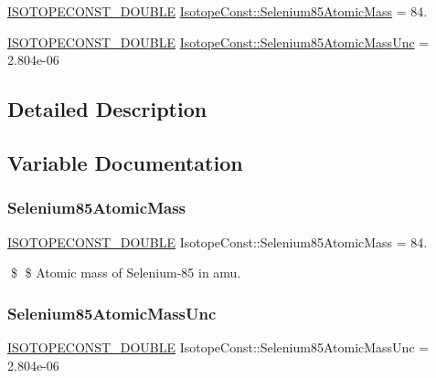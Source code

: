 \begin{DoxyCompactItemize}
\item 
\mbox{\hyperlink{group___isotope_const-_macros_ga8f45a7272ce02c0b4c65c44636ed719a}{I\+S\+O\+T\+O\+P\+E\+C\+O\+N\+S\+T\+\_\+\+D\+O\+U\+B\+LE}} \mbox{\hyperlink{group___isotope_const-_selenium-_se85_ga72aab77df93bbc245f383f331e1ce17c}{Isotope\+Const\+::\+Selenium85\+Atomic\+Mass}} = 84.
\item 
\mbox{\hyperlink{group___isotope_const-_macros_ga8f45a7272ce02c0b4c65c44636ed719a}{I\+S\+O\+T\+O\+P\+E\+C\+O\+N\+S\+T\+\_\+\+D\+O\+U\+B\+LE}} \mbox{\hyperlink{group___isotope_const-_selenium-_se85_ga444be9888ea6e24f270e89724ccba2f8}{Isotope\+Const\+::\+Selenium85\+Atomic\+Mass\+Unc}} = 2.\+804e-\/06
\end{DoxyCompactItemize}


\subsection{Detailed Description}


\subsection{Variable Documentation}
\mbox{\label{group___isotope_const-_selenium-_se85_ga72aab77df93bbc245f383f331e1ce17c}} 
\subsubsection{\texorpdfstring{Selenium85\+Atomic\+Mass}{Selenium85AtomicMass}}
{\footnotesize\ttfamily \mbox{\hyperlink{group___isotope_const-_macros_ga8f45a7272ce02c0b4c65c44636ed719a}{I\+S\+O\+T\+O\+P\+E\+C\+O\+N\+S\+T\+\_\+\+D\+O\+U\+B\+LE}} Isotope\+Const\+::\+Selenium85\+Atomic\+Mass = 84.}

\$ \$ Atomic mass of Selenium-\/85 in amu. \mbox{\label{group___isotope_const-_selenium-_se85_ga444be9888ea6e24f270e89724ccba2f8}} 
\subsubsection{\texorpdfstring{Selenium85\+Atomic\+Mass\+Unc}{Selenium85AtomicMassUnc}}
{\footnotesize\ttfamily \mbox{\hyperlink{group___isotope_const-_macros_ga8f45a7272ce02c0b4c65c44636ed719a}{I\+S\+O\+T\+O\+P\+E\+C\+O\+N\+S\+T\+\_\+\+D\+O\+U\+B\+LE}} Isotope\+Const\+::\+Selenium85\+Atomic\+Mass\+Unc = 2.\+804e-\/06}


